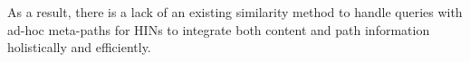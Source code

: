 


As a result, there is a lack of an existing similarity method to handle queries with ad-hoc meta-paths for HINs to integrate both content and path information holistically and efficiently.